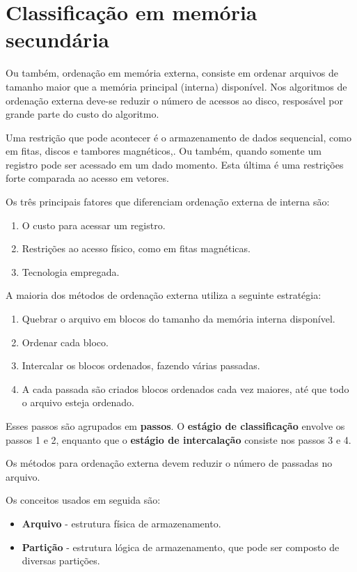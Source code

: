 \chapter{Classificação em memória secundária}

Ou também, ordenação em memória externa, consiste em ordenar arquivos de tamanho
maior que a memória principal (interna) disponível.
Nos algoritmos de ordenação externa deve-se reduzir o número de acessos ao disco,
resposável por grande parte do custo do algoritmo.

Uma restrição que pode acontecer é o armazenamento de dados sequencial, como em
fitas, discos e tambores magnéticos,.
Ou também, quando somente um registro pode ser acessado em um dado momento.
Esta última é uma restrições forte comparada ao acesso em vetores.

Os três principais fatores que diferenciam ordenação externa de interna são:
\begin{enumerate}
\item O custo para acessar um registro.
\item Restrições ao acesso físico, como em fitas magnéticas.
\item Tecnologia empregada.
\end{enumerate}

A maioria dos métodos de ordenação externa utiliza a seguinte estratégia:
\begin{enumerate}
\item Quebrar o arquivo em blocos do tamanho da memória interna disponível.
\item Ordenar cada bloco.
\item Intercalar os blocos ordenados, fazendo várias passadas.
\item A cada passada são criados blocos ordenados cada vez maiores, até que todo 
o arquivo esteja ordenado.
\end{enumerate}
Esses passos são agrupados em \textbf{passos}. 
O {\bf estágio de classificação} envolve os passos 1 e 2, enquanto que
o {\bf estágio de intercalação} consiste nos passos 3 e 4.

Os métodos para ordenação externa devem reduzir o número de passadas no arquivo.

Os conceitos usados em seguida são:
\begin{itemize}
\item {\bf Arquivo} - estrutura física de armazenamento. 
\item {\bf Partição} - estrutura lógica de armazenamento, que pode ser composto de
diversas partições.
\end{itemize}

